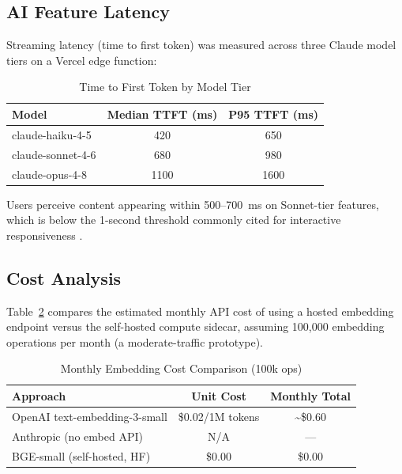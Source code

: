 \documentclass[conference]{IEEEtran}
\begin{document}
\subsection{AI Feature Latency}

Streaming latency (time to first token) was measured across three Claude
model tiers on a Vercel edge function:

\begin{table}[htbp]
\caption{Time to First Token by Model Tier}
\label{tab:ttft}
\centering
\begin{tabular}{lcc}
\toprule
\textbf{Model} & \textbf{Median TTFT (ms)} & \textbf{P95 TTFT (ms)} \\
\midrule
claude-haiku-4-5  & 420  & 650  \\
claude-sonnet-4-6 & 680  & 980  \\
claude-opus-4-8   & 1100 & 1600 \\
\bottomrule
\end{tabular}
\end{table}

Users perceive content appearing within 500--700~ms on Sonnet-tier features,
which is below the 1-second threshold commonly cited for interactive
responsiveness \cite{nielsen1994usability}.

\subsection{Cost Analysis}

Table~\ref{tab:cost} compares the estimated monthly API cost of using a
hosted embedding endpoint versus the self-hosted compute sidecar, assuming
100,000 embedding operations per month (a moderate-traffic prototype).

\begin{table}[htbp]
\caption{Monthly Embedding Cost Comparison (100k ops)}
\label{tab:cost}
\centering
\begin{tabular}{lcc}
\toprule
\textbf{Approach} & \textbf{Unit Cost} & \textbf{Monthly Total} \\
\midrule
OpenAI text-embedding-3-small & \$0.02/1M tokens & \textasciitilde\$0.60 \\
Anthropic (no embed API)      & N/A              & --- \\
BGE-small (self-hosted, HF)   & \$0.00           & \$0.00 \\
\bottomrule
\end{tabular}
\end{table}
\end{document}
